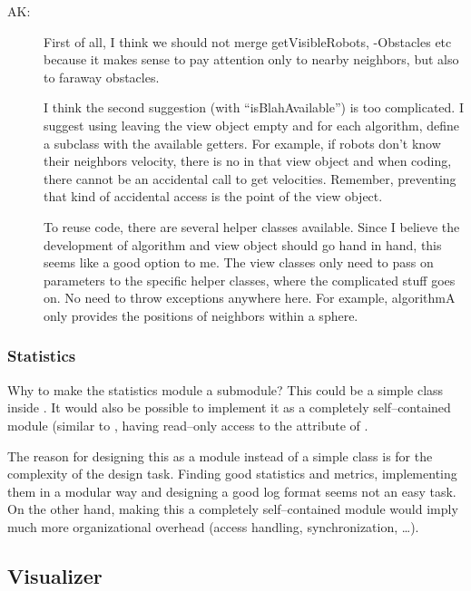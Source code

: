 \begin{appendix}
\begin{resolution}
\begin{description}
	\item [AK:] First of all, I think we should not merge getVisibleRobots, -Obstacles etc because it makes sense to pay attention only to nearby neighbors, but also to faraway obstacles.
	\par
	I think the second suggestion (with "`isBlahAvailable"') is too complicated. I suggest using leaving the view object empty and for each algorithm, define a subclass with the available getters. For example, if robots don't know their neighbors velocity, there is no  in that view object and when coding, there cannot be an accidental call to get velocities. Remember, preventing that kind of accidental access is the point of the view object.
	\par
	To reuse code, there are several helper classes available. Since I believe the development of algorithm and view object should go hand in hand, this seems like a good option to me. The view classes only need to pass on parameters to the specific helper classes, where the complicated stuff goes on. No need to throw exceptions anywhere here. For example, algorithmA only provides the positions of neighbors within a sphere. 
\end{description}
\end{resolution}


\subsubsection{Statistics}
\begin{designQuestion}
Why to make the statistics module a submodule? This could be a simple class inside . It would also be possible to implement it as a completely self--contained module (similar to , having read--only access to the  attribute of .
\end{designQuestion}
\begin{resolution}
The reason for designing this as a module instead of a simple class is for the complexity of the design task. Finding good statistics and metrics, implementing them in a modular way and designing a good log format seems not an easy task. On the other hand, making this a completely self--contained module would imply much more organizational overhead (access handling, synchronization, \ldots).
\end{resolution}


\subsection{Visualizer}


\end{appendix}
